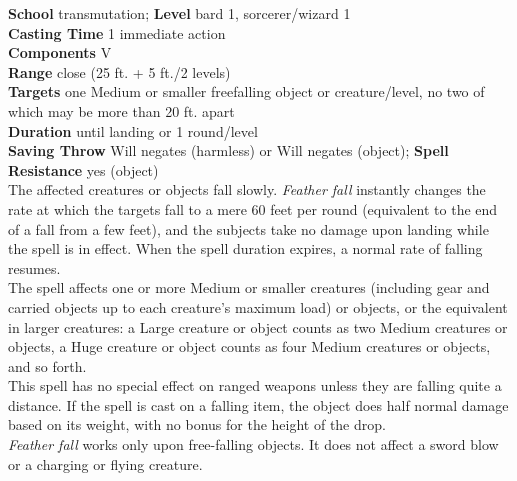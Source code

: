 \textbf{School} transmutation; \textbf{Level} bard 1, sorcerer/wizard 1\\
\textbf{Casting Time} 1 immediate action\\
\textbf{Components} V\\
\textbf{Range} close (25 ft. + 5 ft./2 levels)\\
\textbf{Targets} one Medium or smaller freefalling object or creature/level, no two of which may be more than 20 ft. apart\\
\textbf{Duration} until landing or 1 round/level\\
\textbf{Saving Throw }Will negates (harmless) or Will negates (object); \textbf{Spell Resistance} yes (object)\\
The affected creatures or objects fall slowly. \textit{Feather fall }instantly changes the rate at which the targets fall to a mere 60 feet per round (equivalent to the end of a fall from a few feet), and the subjects take no damage upon landing while the spell is in effect. When the spell duration expires, a normal rate of falling resumes.\\
The spell affects one or more Medium or smaller creatures (including gear and carried objects up to each creature's maximum load) or objects, or the equivalent in larger creatures: a Large creature or object counts as two Medium creatures or objects, a Huge creature or object counts as four Medium creatures or objects, and so forth.\\
This spell has no special effect on ranged weapons unless they are falling quite a distance. If the spell is cast on a falling item, the object does half normal damage based on its weight, with no bonus for the height of the drop.\\
\textit{Feather fall }works only upon free-falling objects. It does not affect a sword blow or a charging or flying creature.\\
